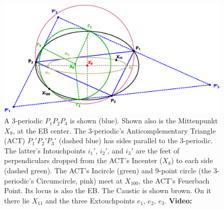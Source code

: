\begin{figure}
    \centering
    \includegraphics[width=.75\textwidth]{pics/1080_act_intouch.eps}
    \caption{A 3-periodic $P_1P_2P_3$ is shown (blue). Shown also is the Mittenpunkt $X_9$, at the EB center. The 3-periodic's Anticomplementary Triangle (ACT) $P_1'P_2'P_3'$ (dashed blue) has sides parallel to the 3-periodic. The latter's Intouchpoints $i_1'$, $i_2'$, and $i_3'$ are the feet of perpendiculars dropped from the ACT's Incenter ($X_8$) to each side (dashed green). The ACT's Incircle (green) and 9-point circle (the 3-periodic's Circumcircle, pink) meet at $X_{100}$, the ACT's Feuerbach Point. Its locus is also the EB. The Caustic is shown brown. On it there lie $X_{11}$ and the three Extouchpoints $e_1$, $e_2$, $e_3$. \textbf{Video:} \cite[PL\#09]{reznik2020-playlist-intriguing}}
    \label{fig:act_intouch}
\end{figure}
